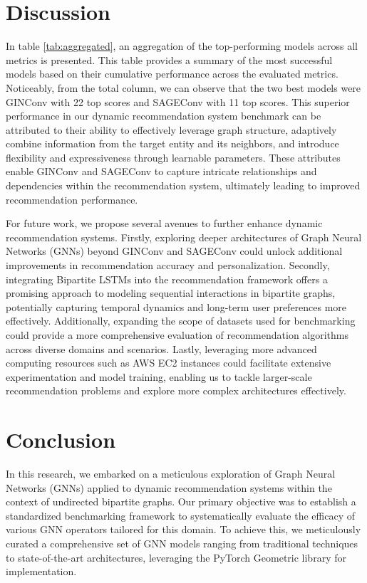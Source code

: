 \documentclass{scrartcl}
\begin{document}
\section{Discussion}

\quad In table \ref{tab:aggregated}, an aggregation of the top-performing models across all metrics is presented. This table provides a summary of the most successful models based on their cumulative performance across the evaluated metrics. Noticeably, from the total column, we can observe that the two best models were GINConv with 22 top scores and SAGEConv with 11 top scores. This superior performance in our dynamic recommendation system benchmark can be attributed to their ability to effectively leverage graph structure, adaptively combine information from the target entity and its neighbors, and introduce flexibility and expressiveness through learnable parameters. These attributes enable GINConv and SAGEConv to capture intricate relationships and dependencies within the recommendation system, ultimately leading to improved recommendation performance.

For future work, we propose several avenues to further enhance dynamic recommendation systems. Firstly, exploring deeper architectures of Graph Neural Networks (GNNs) beyond GINConv and SAGEConv could unlock additional improvements in recommendation accuracy and personalization. Secondly, integrating Bipartite LSTMs into the recommendation framework offers a promising approach to modeling sequential interactions in bipartite graphs, potentially capturing temporal dynamics and long-term user preferences more effectively. Additionally, expanding the scope of datasets used for benchmarking could provide a more comprehensive evaluation of recommendation algorithms across diverse domains and scenarios. Lastly, leveraging more advanced computing resources such as AWS EC2 instances could facilitate extensive experimentation and model training, enabling us to tackle larger-scale recommendation problems and explore more complex architectures effectively.



\section{Conclusion}

\quad In this research, we embarked on a meticulous exploration of Graph Neural Networks (GNNs) applied to dynamic recommendation systems within the context of undirected bipartite graphs. Our primary objective was to establish a standardized benchmarking framework to systematically evaluate the efficacy of various GNN operators tailored for this domain. To achieve this, we meticulously curated a comprehensive set of GNN models ranging from traditional techniques to state-of-the-art architectures, leveraging the PyTorch Geometric library for implementation.
\end{document}
